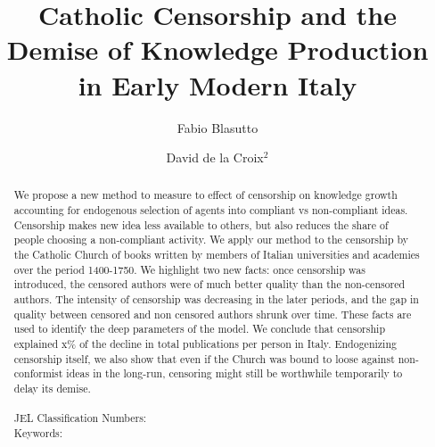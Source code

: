 \documentclass[12pt]{article}
\title{Catholic Censorship and the Demise of Knowledge Production in Early Modern Italy}
\author{Fabio Blasutto \and David de la Croix$^2$}
\begin{document}
\maketitle


\begin{abstract}
	We propose a new method to measure to effect of censorship on knowledge growth  accounting for endogenous selection of agents into compliant vs non-compliant ideas. 
	Censorship makes new idea less available to others, but also reduces the share of people choosing a non-compliant activity. 
	We apply our method to the censorship by the Catholic Church of books written by members of Italian universities and academies over the period 1400-1750.
	We highlight two new facts: once censorship was introduced, the censored authors were of much better quality than the non-censored authors.  The intensity of censorship was decreasing in the later periods, and the gap in quality between censored and non censored authors shrunk over time. These facts are used to identify the deep parameters of the model. We conclude that censorship explained x\% of the decline in total publications per person in Italy. Endogenizing censorship itself, we also show that even if the Church was bound to loose against non-conformist ideas in the long-run, censoring might still be worthwhile temporarily to delay its demise.\\
	\mbox{ }\\
	JEL Classification Numbers: \\
	Keywords:
\end{abstract}

\end{document}
